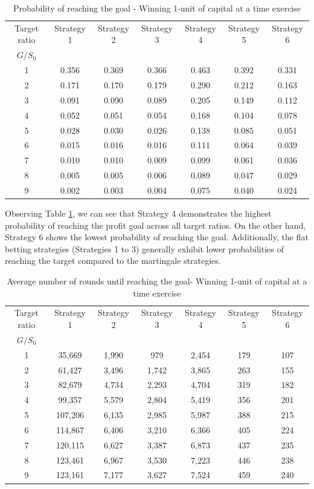 \documentclass[11pt,twoside]{article}
\numberwithin{Theorem}{section}
\numberwithin{Definition}{section}
\numberwithin{Lemma}{section}
\numberwithin{Algorithm}{section}
\numberwithin{equation}{section}
\begin{document}
\begin{table}[h!]
\centering
\caption{Probability of reaching the goal - Winning 1-unit of capital at a time exercise}
\begin{tabular}{|c|c|c|c|c|c|c|}
\hline
Target ratio & Strategy 1 &  Strategy 2 &  Strategy 3 &  Strategy 4 & Strategy 5 &  Strategy 6 \\
$G/S_{0}$ &  &  &  &   &  &  \\
\hline\hline
1 &0.356&0.369&0.366& 0.463&0.392&0.331\\
2 &0.171&0.170&0.179&0.290&0.212&0.163\\
3 &0.091&0.090&0.089&0.205&0.149&0.112\\
4 &0.052&0.051&0.054&0.168&0.104&0.078\\
5 &0.028&0.030&0.026&0.138&0.085&0.051\\
6 &0.015&0.016&0.016&0.111&0.064&0.039\\
7 &0.010&0.010&0.009&0.099&0.061&0.036\\
8 &0.005&0.005&0.006&0.089&0.047&0.029\\
9 &0.002&0.003&0.004&0.075&0.040&0.024\\
\hline
\end{tabular}
\label{results_exercise1_1}
\end{table}

Observing Table \ref{results_exercise1_1}, we can see that Strategy 4 demonstrates the highest probability of reaching the profit goal across all target ratios. On the other hand, Strategy 6 shows the lowest probability of reaching the goal. Additionally, the flat betting strategies (Strategies 1 to 3) generally exhibit lower probabilities of reaching the target compared to the martingale strategies.

\begin{table}[h!]
\centering
\caption{Average number of rounds until reaching the goal-  Winning 1-unit of capital at a time exercise}
\begin{tabular}{|c|c|c|c|c|c|c|}
\hline
Target ratio & Strategy 1 &  Strategy 2 &  Strategy 3 &  Strategy 4 & Strategy 5 &  Strategy 6 \\
$G/S_{0}$ &  &  &  &   &  &  \\
\hline\hline
1 &35,669&1,990&979&2,454&179&107\\
2 &61,427&3,496&1,742&3,865&263&155\\
3 &82,679&4,734&2,293&4,704&319&182\\
4 &99,357&5,579&2,804&5,419&356&201\\
5 &107,206&6,135&2,985&5,987&388&215\\
6 &114,867&6,406&3,210&6,366&405&224\\
7 &120,115&6,627&3,387&6,873&437&235\\
8 &123,461&6,967&3,530&7,223&446&238\\
9 &123,161&7,177&3,627&7,524&459&240\\
\hline
\end{tabular}
\label{results_exercise1_2}
\end{table}
\end{document}
